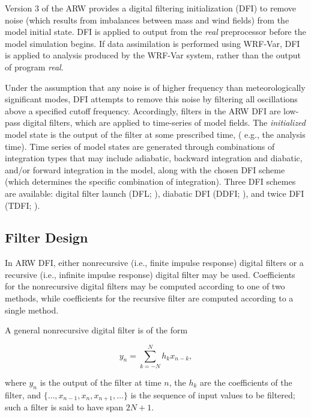 Version 3 of the ARW provides a digital filtering initialization (DFI) to 
remove noise (which results from imbalances between mass and wind fields) 
from the model initial state. DFI is applied to output from the {\it real} 
preprocessor before the model simulation begins. If data assimilation is 
performed using WRF-Var, DFI is applied to analysis produced by the 
WRF-Var system, rather than the output of program {\it real}.

Under the assumption that any noise is of 
higher frequency than meteorologically significant modes, DFI attempts to 
remove this noise by filtering all oscillations above a specified cutoff 
frequency. Accordingly, filters in the ARW DFI are low-pass digital 
filters, which are applied to time-series of model fields. The {\it initialized} 
model state is the output of the filter at some prescribed time, 
( e.g., the analysis time). Time series of model states are generated through 
combinations of integration types that may include adiabatic, backward integration and diabatic, and/or forward 
integration in the model, along with the chosen DFI scheme (which determines the 
specific combination of integration). Three DFI schemes are available: 
digital filter launch (DFL; \cite{lynchhuang94}), diabatic DFI (DDFI; \cite{huanglynch93}), 
and twice DFI (TDFI; \cite{lynchhuang94}).

\subsection{Filter Design}

In ARW DFI, either nonrecursive (i.e., finite impulse response) digital 
filters or a recursive (i.e., infinite impulse response) digital filter may 
be used. Coefficients for the nonrecursive digital filters may be 
computed according to one of two methods, while coefficients for the 
recursive filter are computed according to a single method.

A general nonrecursive digital filter is of the form

\begin{equation}
y_n = \sum_{k=-N}^{N} h_k x_{n-k},
\label{fir_filter}
\end{equation}

\noindent
where $y_n$ is the output of the filter at time $n$, the $h_k$ are the 
coefficients of the filter, and $\{ \ldots , x_{n-1}, x_n, x_{n+1}, \ldots \}$ 
is the sequence of input values to be filtered; such a filter is said to have 
span $2N+1$. 

